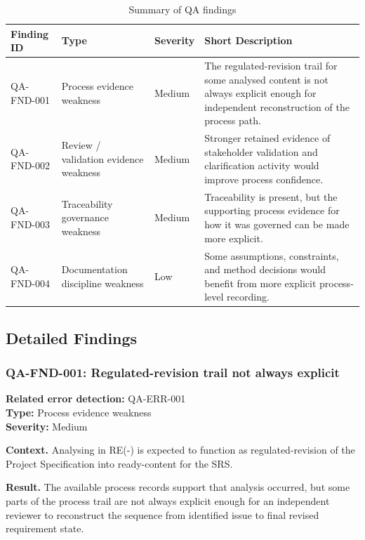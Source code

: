 \documentclass[11pt,a4paper]{article}
\begin{document}
\begin{table}[H]
\centering
\small
\renewcommand{\arraystretch}{1.4}
\begin{tabularx}{\textwidth}{|p{}|p{}|p{}|X|}
\hline
\rowcolor{tableheader}
\textbf{Finding ID} & \textbf{Type} & \textbf{Severity} & \textbf{Short Description} \\
\hline
QA-FND-001 & Process evidence weakness & Medium & The regulated-revision trail for some analysed content is not always explicit enough for independent reconstruction of the process path. \\
\hline
QA-FND-002 & Review / validation evidence weakness & Medium & Stronger retained evidence of stakeholder validation and clarification activity would improve process confidence. \\
\hline
QA-FND-003 & Traceability governance weakness & Medium & Traceability is present, but the supporting process evidence for how it was governed can be made more explicit. \\
\hline
QA-FND-004 & Documentation discipline weakness & Low & Some assumptions, constraints, and method decisions would benefit from more explicit process-level recording. \\
\hline
\end{tabularx}
\caption{Summary of QA findings}
\label{tab:qa-findings-summary}
\end{table}

\subsection{Detailed Findings}

\subsubsection*{QA-FND-001: Regulated-revision trail not always explicit}
\textbf{Related error detection:} QA-ERR-001 \\
\textbf{Type:} Process evidence weakness \\
\textbf{Severity:} Medium

\textbf{Context.} Analysing in RE(-) is expected to function as regulated-revision of the Project Specification into ready-content for the SRS.

\textbf{Result.} The available process records support that analysis occurred, but some parts of the process trail are not always explicit enough for an independent reviewer to reconstruct the sequence from identified issue to final revised requirement state.
\end{document}
